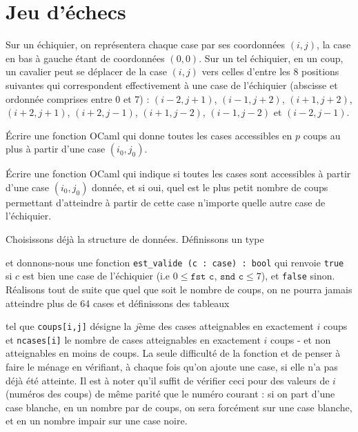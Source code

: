 \renewcommand{\SourceFile}{1-parcours-de-tableaux/src/1-1.ml}

\section{Jeu d'échecs}

Sur un échiquier, on représentera chaque case par ses coordonnées $(i, j)$, la case en bas à gauche étant de coordonnées $(0, 0)$. Sur un tel échiquier, en un coup, un cavalier peut se déplacer de la case $(i, j)$ vers celles d'entre les 8 positions suivantes qui correspondent effectivement à une case de l'échiquier (abscisse et ordonnée comprises entre 0 et 7) : $(i-2, j+1)$, $(i-1, j+2)$, $(i+1, j+2)$, $(i+2, j+1)$, $(i+2, j -1)$, $(i+1, j-2)$, $(i-1, j-2)$ et $(i-2,j-1)$.

\Q
Écrire une fonction OCaml qui donne toutes les cases accessibles en $p$ coups au plus à partir d'une case $(i_0, j_0)$.

\Q
Écrire une fonction OCaml qui indique si toutes les cases sont accessibles à partir d'une case $(i_0, j_0)$ donnée, et si oui, quel est le plus petit nombre de coups permettant d'atteindre à partir de cette case n'importe quelle autre case de l'échiquier.

\Corrige

\Q
Choisissons déjà la structure de données. Définissons un type



et donnons-nous une fonction \texttt{est\_valide (c : case) : bool} qui renvoie \texttt{true} si $c$ est bien une case de l'échiquier (i.e $0\leq \texttt{fst c}$, $\texttt{snd c} \leq 7$), et \texttt{false} sinon. Réalisons tout de suite que quel que soit le nombre de coups, on ne pourra jamais atteindre plus de 64 cases et définissons des tableaux



tel que \texttt{coups[i,j]} désigne la $j$ème des cases atteignables en exactement $i$ coups et \texttt{ncases[i]} le nombre de cases atteignables en exactement $i$ coups - et non atteignables en moins de coups. La seule difficulté de la fonction et de penser à \og faire le ménage \fg en vérifiant, à chaque fois qu'on ajoute une case, si elle n'a pas déjà été atteinte. Il est à noter qu'il suffit de vérifier ceci pour des valeurs de $i$ (numéros des coups) de même parité que le numéro courant : si on part d'une case blanche, en un nombre par de coups, on sera forcément sur une case blanche, et en un nombre impair sur une case noire.

